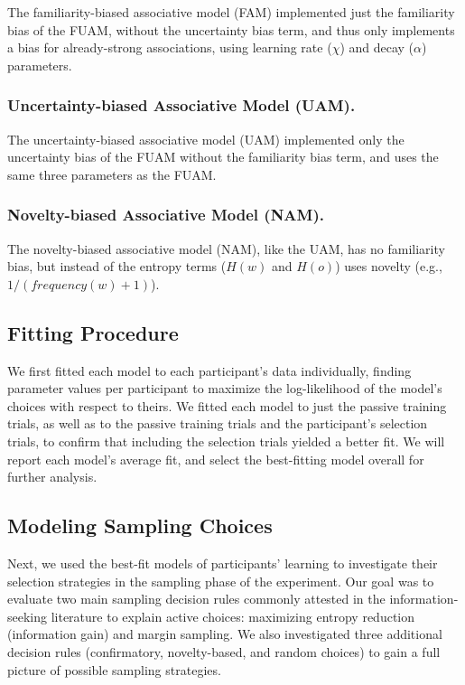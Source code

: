 \documentclass[10pt, letterpaper]{article}
\begin{document}
The familiarity-biased associative model (FAM) implemented just the
familiarity bias of the FUAM, without the uncertainty bias term, and
thus only implements a bias for already-strong associations, using
learning rate (\(\chi\)) and decay (\(\alpha\)) parameters.

\subsubsection{Uncertainty-biased Associative Model
(UAM).}\label{uncertainty-biased-associative-model-uam.}

The uncertainty-biased associative model (UAM) implemented only the
uncertainty bias of the FUAM without the familiarity bias term, and uses
the same three parameters as the FUAM.

\subsubsection{Novelty-biased Associative Model
(NAM).}\label{novelty-biased-associative-model-nam.}

The novelty-biased associative model (NAM), like the UAM, has no
familiarity bias, but instead of the entropy terms (\(H(w)\) and
\(H(o)\)) uses novelty (e.g., \(1/(frequency(w)+1)\)).

\subsection{Fitting Procedure}\label{fitting-procedure}

We first fitted each model to each participant's data individually,
finding parameter values per participant to maximize the log-likelihood
of the model's choices with respect to theirs. We fitted each model to
just the passive training trials, as well as to the passive training
trials and the participant's selection trials, to confirm that including
the selection trials yielded a better fit. We will report each model's
average fit, and select the best-fitting model overall for further
analysis.

\subsection{Modeling Sampling Choices}\label{modeling-sampling-choices}

Next, we used the best-fit models of participants' learning to
investigate their selection strategies in the sampling phase of the
experiment. Our goal was to evaluate two main sampling decision rules
commonly attested in the information-seeking literature to explain
active choices: maximizing entropy reduction (information gain) and
margin sampling. We also investigated three additional decision rules
(confirmatory, novelty-based, and random choices) to gain a full picture
of possible sampling strategies.
\end{document}
